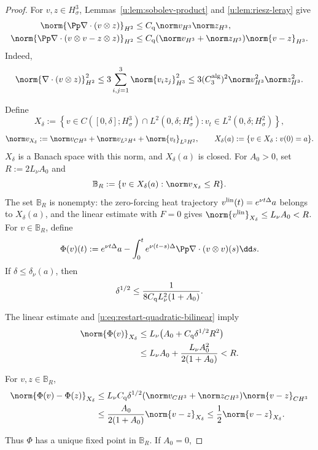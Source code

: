 \begin{proof}
For \(v,z\in H^3_\sigma\), Lemmas~\ref{u:lem:sobolev-product} and
\ref{u:lem:riesz-leray} give
\begin{align}
 \norm{\Pp\nabla\cdot(v\otimes z)}_{H^2}
 &\le C_{\rm q}\norm v_{H^3}\norm z_{H^3},
 \label{u:eq:restart-quadratic-bilinear}\\
 \norm{\Pp\nabla\cdot(v\otimes v-z\otimes z)}_{H^2}
 &\le C_{\rm q}(\norm v_{H^3}+\norm z_{H^3})
 \norm{v-z}_{H^3}.
 \label{u:eq:restart-quadratic-difference}
\end{align}
Indeed,
\[
 \norm{\nabla\cdot(v\otimes z)}_{H^2}^2
 \le3\sum_{i,j=1}^3\norm{v_i z_j}_{H^3}^2
 \le3(C_3^{\rm alg})^2\norm v_{H^3}^2\norm z_{H^3}^2.
\]

Define
\[
 X_\delta:=
 \left\{v\in C([0,\delta];H^3_\sigma)\cap L^2(0,\delta;H^4_\sigma):
 v_t\in L^2(0,\delta;H^2_\sigma)\right\},
\]
\[
 \norm v_{X_\delta}:=\norm v_{C H^3}
 +\norm v_{L^2H^4}+\norm{v_t}_{L^2H^2},
 \qquad
 X_\delta(a):=\{v\in X_\delta:v(0)=a\}.
\]
\(X_\delta\) is a Banach space with this norm, and \(X_\delta(a)\) is closed.
For \(A_0>0\), set \(R:=2L_\nu A_0\) and
\[
 \mathbb B_R:=\{v\in X_\delta(a):\norm v_{X_\delta}\le R\}.
\]
The set \(\mathbb B_R\) is nonempty: the zero-forcing heat trajectory
\(v^{\rm lin}(t)=e^{\nu t\Delta}a\) belongs to \(X_\delta(a)\), and the
linear estimate with \(F=0\) gives
\(\norm{v^{\rm lin}}_{X_\delta}\le L_\nu A_0<R\).
For \(v\in\mathbb B_R\), define
\[
 \Phi(v)(t):=e^{\nu t\Delta}a
 -\int_0^te^{\nu(t-s)\Delta}
 \Pp\nabla\cdot(v\otimes v)(s)\dd s.
\]
If \(\delta\le\delta_\nu(a)\), then
\[
 \delta^{1/2}\le
 \frac{1}{8C_{\rm q}L_\nu^2(1+A_0)}.
\]
\begin{samepage}
The linear estimate and \eqref{u:eq:restart-quadratic-bilinear} imply
\begin{align*}
 \norm{\Phi(v)}_{X_\delta}
 &\le L_\nu\bigl(A_0+C_{\rm q}\delta^{1/2}R^2\bigr)\\
 &\le L_\nu A_0+\frac{L_\nu A_0^2}{2(1+A_0)}
 <R.
\end{align*}
\end{samepage}
\begin{samepage}
For \(v,z\in\mathbb B_R\),
\begin{align*}
 \norm{\Phi(v)-\Phi(z)}_{X_\delta}
 &\le L_\nu C_{\rm q}\delta^{1/2}
 (\norm v_{C H^3}+\norm z_{C H^3})
 \norm{v-z}_{C H^3}\\
 &\le\frac{A_0}{2(1+A_0)}\norm{v-z}_{X_\delta}
 \le\frac12\norm{v-z}_{X_\delta}.
\end{align*}
\end{samepage}
Thus \(\Phi\) has a unique fixed point in \(\mathbb B_R\).  If \(A_0=0\),

\end{proof}
